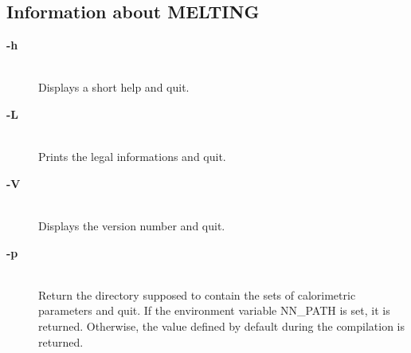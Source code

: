 \documentclass{article}
\begin{document}
\subsection{Information about MELTING}
\begin{description}

\item [\textbf{-h}]\mbox{}\\ 
  Displays a short help and quit.
\item [\textbf{-L}]\mbox{}\\ 
  Prints the legal informations and quit. 
\item [\textbf{-V}  ]\mbox{}\\ 
  Displays the version number and quit.  
\item [\textbf{-p}]\mbox{}\\ 
  Return the directory supposed to contain the sets of calorimetric parameters and quit. 
  If the environment variable NN\_PATH is set, it is returned. Otherwise, the value
  defined by default during the compilation is returned.
\end{description}
\end{document}
